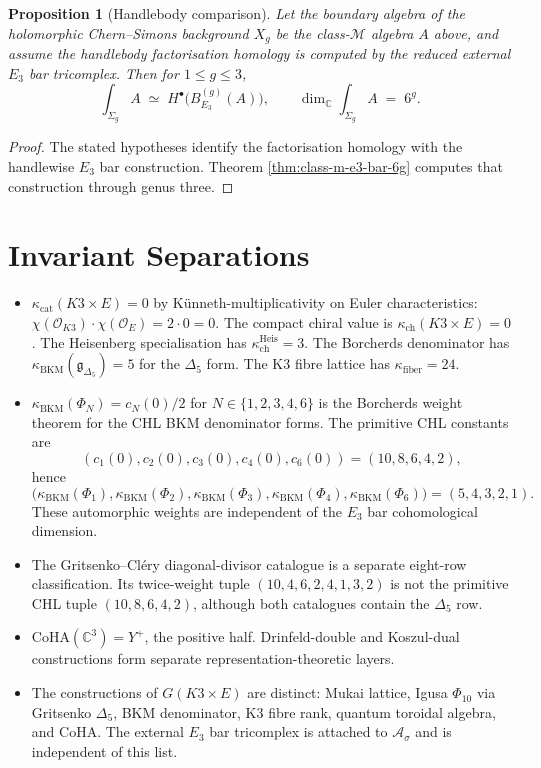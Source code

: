 \documentclass[11pt]{article}
\theoremstyle{plain}
\newtheorem{proposition}[theorem]{Proposition}
\theoremstyle{definition}
\theoremstyle{remark}
\newcommand{\C}{\mathbb{C}}
\newcommand{\cA}{\mathcal{A}}
\newcommand{\cO}{\mathcal{O}}
\newcommand{\kch}{\kappa_{\mathrm{ch}}}
\newcommand{\kcat}{\kappa_{\mathrm{cat}}}
\newcommand{\kBKM}{\kappa_{\mathrm{BKM}}}
\newcommand{\kfib}{\kappa_{\mathrm{fiber}}}
\begin{document}
\begin{proposition}[Handlebody comparison]
\label{prop:6d-hcs-skein}
Let the boundary algebra of the holomorphic Chern--Simons background
$X_g$ be the class-$\mathcal{M}$ algebra $A$ above, and assume the
handlebody factorisation homology is computed by the reduced external $E_3$ bar
tricomplex. Then for $1\leq g\leq 3$,
\[
 \int_{\Sigma_g} A \;\simeq\; H^\bullet\bigl(B_{E_3}^{(g)}(A)\bigr),
 \qquad \dim_\C\!\int_{\Sigma_g} A \;=\; 6^g.
\]
\end{proposition}

\begin{proof}
The stated hypotheses identify the factorisation homology with the
handlewise $E_3$ bar construction. Theorem
\ref{thm:class-m-e3-bar-6g} computes that construction through genus three.
\end{proof}

\section{Invariant Separations}
\label{sec:cross-consistency}

\begin{itemize}
 \item $\kcat(K3\times E)=0$ by K\"unneth-multiplicativity on Euler
   characteristics: $\chi(\cO_{K3})\cdot\chi(\cO_E)=2\cdot 0=0$.
   The compact chiral value is $\kch(K3\times E)=0$.
   The Heisenberg specialisation has $\kch^{\mathrm{Heis}}=3$.
   The Borcherds denominator has $\kBKM(\mathfrak{g}_{\Delta_5})=5$
   for the $\Delta_5$ form. The K3 fibre lattice has $\kfib=24$.
 \item $\kBKM(\Phi_N)=c_N(0)/2$ for $N\in\{1,2,3,4,6\}$ is the Borcherds
   weight theorem for the CHL BKM denominator forms. The primitive CHL
   constants are
   \[
    (c_1(0),c_2(0),c_3(0),c_4(0),c_6(0))=(10,8,6,4,2),
   \]
   hence
   \[
    \bigl(\kBKM(\Phi_1),\kBKM(\Phi_2),\kBKM(\Phi_3),
    \kBKM(\Phi_4),\kBKM(\Phi_6)\bigr)=(5,4,3,2,1).
   \]
   These automorphic weights are independent of the $E_3$ bar
   cohomological dimension.
 \item The Gritsenko--Cl\'ery diagonal-divisor catalogue is a separate
   eight-row classification. Its twice-weight tuple
   $(10,4,6,2,4,1,3,2)$ is not the primitive CHL tuple
   $(10,8,6,4,2)$, although both catalogues contain the $\Delta_5$ row.
 \item $\mathrm{CoHA}(\C^3)=Y^+$, the positive half. Drinfeld-double and
   Koszul-dual constructions form separate representation-theoretic layers.
 \item The constructions of $G(K3\times E)$ are distinct: Mukai lattice,
   Igusa $\Phi_{10}$ via Gritsenko $\Delta_5$, BKM denominator, K3 fibre
   rank, quantum toroidal algebra, and CoHA. The external $E_3$ bar
   tricomplex is attached to $\cA_\sigma$ and is independent of this list.
\end{itemize}
\end{document}
